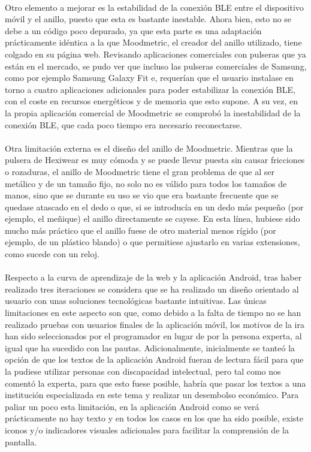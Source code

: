 \paragraph{}
Otro elemento a mejorar es la estabilidad de la conexión BLE entre el dispositivo móvil y el anillo, puesto que esta es bastante inestable. Ahora bien, esto no se debe a un código poco depurado, ya que esta parte es una adaptación prácticamente idéntica a la que Moodmetric, el creador del anillo utilizado, tiene colgado en su página web. Revisando aplicaciones comerciales con pulseras que ya están en el mercado, se pudo ver que incluso las pulseras comerciales de Samsung, como por ejemplo Samsung Galaxy Fit e, requerían que el usuario instalase en torno a cuatro aplicaciones adicionales para poder estabilizar la conexión BLE, con el coste en recursos energéticos y de memoria que esto supone. A su vez, en la propia aplicación comercial de Moodmetric se comprobó la inestabilidad de la conexión BLE, que cada poco tiempo era necesario reconectarse.

\paragraph{}
Otra limitación externa es el diseño del anillo de Moodmetric. Mientras que la pulsera de Hexiwear es muy cómoda y se puede llevar puesta sin causar fricciones o rozaduras, el anillo de Moodmetric tiene el gran problema de que al ser metálico y de un tamaño fijo, no solo no es válido para todos los tamaños de manos, sino que se durante su uso se vio que era bastante frecuente que se quedase atascado en el dedo o que, si se introducía en un dedo más pequeño (por ejemplo, el meñique) el anillo directamente se cayese. En esta línea, hubiese sido mucho más práctico que el anillo fuese de otro material menos rígido (por ejemplo, de un plástico blando) o que permitiese ajustarlo en varias extensiones, como sucede con un reloj.

\paragraph{}
Respecto a la curva de aprendizaje de la web y la aplicación Android, tras haber realizado tres iteraciones se considera que se ha realizado un diseño orientado al usuario con unas soluciones tecnológicas bastante intuitivas. Las únicas limitaciones en este aspecto son que, como debido a la falta de tiempo no se han realizado pruebas con usuarios finales de la aplicación móvil, los motivos de la ira han sido seleccionados por el programador en lugar de por la persona experta, al igual que ha sucedido con las pautas. Adicionalmente, inicialmente se tanteó la opción de que los textos de la aplicación Android fueran de lectura fácil para que la pudiese utilizar personas con discapacidad intelectual, pero tal como nos comentó la experta, para que esto fuese posible, habría que pasar los textos a una institución especializada en este tema y realizar un desembolso económico. Para paliar un poco esta limitación, en la aplicación Android como se verá prácticamente no hay texto y en todos los casos en los que ha sido posible, existe iconos y/o indicadores visuales adicionales para facilitar la comprensión de la pantalla.

